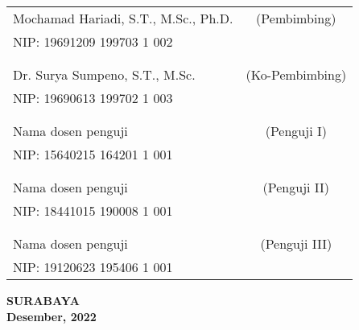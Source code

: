 \noindent
\begin{tabularx}{\textwidth}{X c}
  Mochamad Hariadi, S.T., M.Sc., Ph.D. & (Pembimbing)    \\
  NIP: 19691209 199703 1 002           &                 \\
                                       &                 \\
                                       &                 \\
  Dr. Surya Sumpeno, S.T., M.Sc.       & (Ko-Pembimbing) \\
  NIP: 19690613 199702 1 003           &                 \\
                                       &                 \\
                                       &                 \\
  Nama dosen penguji                   & (Penguji I)     \\
  NIP: 15640215 164201 1 001           &                 \\
                                       &                 \\
                                       &                 \\
  Nama dosen penguji                   & (Penguji II)    \\
  NIP: 18441015 190008 1 001           &                 \\
                                       &                 \\
                                       &                 \\
  Nama dosen penguji                   & (Penguji III)   \\
  NIP: 19120623 195406 1 001           &                 \\
\end{tabularx}
\endgroup

\vspace{4ex}

\begin{center}
  \textbf{SURABAYA} \\
  \textbf{Desember, 2022}
\end{center}
\endgroup

